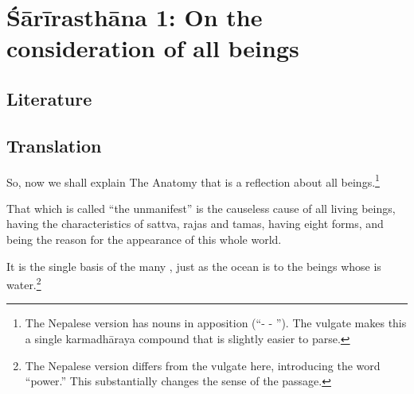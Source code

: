 
\chapter{Śārīrasthāna 1:  On the consideration of all beings}



\section{Literature} 


\section{Translation}

\begin{translation}
    
    \item [1] 
    
    So, now we shall explain The Anatomy that is a reflection about all 
    beings.\footnote{The Nepalese version has nouns in apposition 
    (“- - ”).  The vulgate makes this a single 
    karmadhāraya compound that is slightly easier to parse.} 
    
\item[3]


That which is called “the unmanifest” is the causeless cause of all living beings,  
having the characteristics of sattva, rajas and tamas, having eight forms, and 
being the reason for the appearance of this whole world.
    
    It is the single basis of the many , just as the ocean is to the beings whose 
is water.\footnote{The Nepalese version differs from the vulgate
    here, introducing the word “power.”  This substantially changes the sense of 
    the passage.}
    
    
\end{translation}

